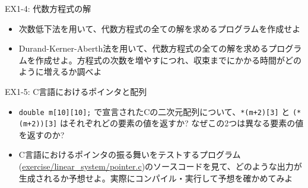 \documentclass[dvipdfmx]{beamer}
\begin{document}
\begin{frame}[t,fragile]{EX1-4: 代数方程式の解}
  \begin{itemize}
    \setlength{\itemsep}{1em}
  \item[1-4-1] 次数低下法を用いて、代数方程式の全ての解を求めるプログラムを作成せよ
  \item[1-4-2] Durand-Kerner-Aberth法を用いて、代数方程式の全ての解を求めるプログラムを作成せよ。方程式の次数を増やすにつれ、収束までにかかる時間がどのように増えるか調べよ
  \end{itemize}    
\end{frame}

\begin{frame}[t,fragile]{EX1-5: C言語におけるポインタと配列}
  \begin{itemize}
    \setlength{\itemsep}{1em}
  \item[1-5-1] \verb+double m[10][10];+ で宣言されたCの二次元配列について、\verb^*(m+2)[3]^ と \verb^(*(m+2))[3]^ はそれぞれどの要素の値を返すか? なぜこの2つは異なる要素の値を返すのか?
  \item[1-5-2] C言語におけるポインタの振る舞いをテストするプログラム(\href{https://github.com/todo-group/computer-experiments/exercise/linear_system/pointer.c}{exercise/linear\_system/pointer.c})のソースコードを見て、どのような出力が生成されるか予想せよ。実際にコンパイル・実行して予想を確かめてみよ
  \end{itemize}
\end{frame}
\end{document}
